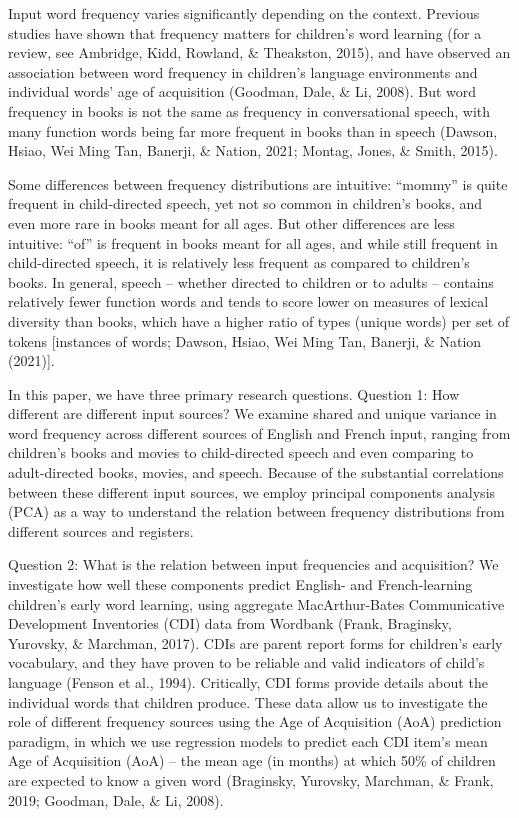 \documentclass[10pt, letterpaper]{article}
\begin{document}
Input word frequency varies significantly depending on the context.
Previous studies have shown that frequency matters for children's word
learning (for a review, see Ambridge, Kidd, Rowland, \& Theakston,
2015), and have observed an association between word frequency in
children's language environments and individual words' age of
acquisition (Goodman, Dale, \& Li, 2008). But word frequency in books is
not the same as frequency in conversational speech, with many function
words being far more frequent in books than in speech (Dawson, Hsiao,
Wei Ming Tan, Banerji, \& Nation, 2021; Montag, Jones, \& Smith, 2015).

Some differences between frequency distributions are intuitive:
``mommy'' is quite frequent in child-directed speech, yet not so common
in children's books, and even more rare in books meant for all ages. But
other differences are less intuitive: ``of'' is frequent in books meant
for all ages, and while still frequent in child-directed speech, it is
relatively less frequent as compared to children's books. In general,
speech -- whether directed to children or to adults -- contains
relatively fewer function words and tends to score lower on measures of
lexical diversity than books, which have a higher ratio of types (unique
words) per set of tokens {[}instances of words; Dawson, Hsiao, Wei Ming
Tan, Banerji, \& Nation (2021){]}.

In this paper, we have three primary research questions. Question 1: How
different are different input sources? We examine shared and unique
variance in word frequency across different sources of English and
French input, ranging from children's books and movies to child-directed
speech and even comparing to adult-directed books, movies, and speech.
Because of the substantial correlations between these different input
sources, we employ principal components analysis (PCA) as a way to
understand the relation between frequency distributions from different
sources and registers.

Question 2: What is the relation between input frequencies and
acquisition? We investigate how well these components predict English-
and French-learning children's early word learning, using aggregate
MacArthur-Bates Communicative Development Inventories (CDI) data from
Wordbank (Frank, Braginsky, Yurovsky, \& Marchman, 2017). CDIs are
parent report forms for children's early vocabulary, and they have
proven to be reliable and valid indicators of child's language (Fenson
et al., 1994). Critically, CDI forms provide details about the
individual words that children produce. These data allow us to
investigate the role of different frequency sources using the Age of
Acquisition (AoA) prediction paradigm, in which we use regression models
to predict each CDI item's mean Age of Acquisition (AoA) -- the mean age
(in months) at which 50\% of children are expected to know a given word
(Braginsky, Yurovsky, Marchman, \& Frank, 2019; Goodman, Dale, \& Li,
2008).
\end{document}
